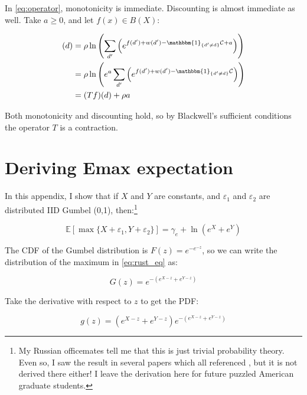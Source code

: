 In \eqref{eq:operator}, monotonicity is immediate.  Discounting is almost
immediate as well. Take $a \geq 0$, and let $f(x) \in B(X)$:

\begin{align}
    [T(f + a)](d) &= \rho \ln \left( \sum_{d'} \left(e^{f(d') + w(d') - \mathbbm{1}_{\{d'\neq d\}}\mathcal{C} + a}\right)\right) \nonumber \\
    &= \rho \ln \left( e^a \sum_{d'} \left(e^{f(d') + w(d') - \mathbbm{1}_{\{d'\neq d\}}\mathcal{C}}\right)\right) \nonumber \\
    &= (Tf)(d) + \rho a \nonumber \\
\end{align}

Both monotonicity and discounting hold, so by Blackwell's sufficient conditions the operator $T$ is a contraction.

\section{Deriving Emax expectation}
\label{sec:exp_der}

In this appendix, I show that if $X$ and $Y$ are constants, and $\varepsilon_1$ and $\varepsilon_2$ are distributed IID Gumbel (0,1), then:\footnote{My Russian officemates tell me that this is just trivial probability theory.  Even so, I saw the result in several papers which all referenced \citet{rust1987optimal}, but it is not derived there either!  I leave the derivation here for future puzzled American graduate students.}

\begin{equation}
    \mathbb{E} \left[\max\{X + \varepsilon_1, Y + \varepsilon_2\}\right] = \gamma_e + \ln \left(e^{X} + e^{Y}\right)
    \label{eq:rust_eq}
\end{equation}

The CDF of the Gumbel distribution is $F(z) = e^{-e^{-z}}$, so we can write the distribution of the maximum in \eqref{eq:rust_eq} as:

\begin{equation}
    G(z) = e^{-\left(e^{X - z} + e^{Y - z}\right)}
\end{equation}

Take the derivative with respect to $z$ to get the PDF:

\begin{equation}
    g(z) = \left(e^{X - z} + e^{Y - z}\right) e^{-\left(e^{X - z} + e^{Y - z}\right)}
\end{equation}

